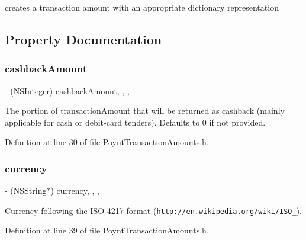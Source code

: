 creates a transaction amount with an appropriate dictionary representation 



\subsection{Property Documentation}
\hypertarget{interface_poynt_transaction_amounts_a865d904d3a3af78f51b64d9acd5d2076}{}\label{interface_poynt_transaction_amounts_a865d904d3a3af78f51b64d9acd5d2076} 
\subsubsection{\texorpdfstring{cashback\+Amount}{cashbackAmount}}
{\footnotesize\ttfamily -\/ (N\+S\+Integer) cashback\+Amount\hspace{0.3cm}{\ttfamily [read]}, {\ttfamily [write]}, {\ttfamily [nonatomic]}, {\ttfamily [assign]}}

The portion of transaction\+Amount that will be returned as cashback (mainly applicable for cash or debit-\/card tenders). Defaults to 0 if not provided. 

Definition at line 30 of file Poynt\+Transaction\+Amounts.\+h.

\hypertarget{interface_poynt_transaction_amounts_a71a9104f71558df8791cedc5e81941a3}{}\label{interface_poynt_transaction_amounts_a71a9104f71558df8791cedc5e81941a3} 
\subsubsection{\texorpdfstring{currency}{currency}}
{\footnotesize\ttfamily -\/ (N\+S\+String$\ast$) currency\hspace{0.3cm}{\ttfamily [read]}, {\ttfamily [write]}, {\ttfamily [nonatomic]}, {\ttfamily [strong]}}

Currency following the I\+S\+O-\/4217 format (\href{http://en.wikipedia.org/wiki/ISO_4217}{\tt http\+://en.\+wikipedia.\+org/wiki/\+I\+S\+O\+\_}). 

Definition at line 39 of file Poynt\+Transaction\+Amounts.\+h.

\hypertarget{interface_poynt_transaction_amounts_a37e598d8b46c97a36f7fbb47e7b150ad}{}\label{interface_poynt_transaction_amounts_a37e598d8b46c97a36f7fbb47e7b150ad} 
